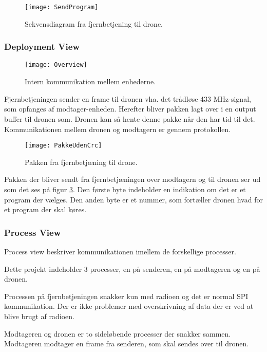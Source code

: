 \documentclass[Main]{subfiles}
\begin{document}
\begin{figure}[H]
\centering
\texttt{[image: SendProgram]}
\caption{Sekvensdiagram fra fjernbetjening til drone.}
\label{Fig:sendProgram}
\end{figure}

\subsubsection*{Deployment View}

\begin{figure}[H]
\centering
\texttt{[image: Overview]}
\caption{Intern kommunikation mellem enhederne.}
\label{Fig:Overview}
\end{figure}

Fjernbetjeningen sender en frame til dronen vha. det trådløse 433 MHz-signal, som opfanges af modtager-enheden.
Herefter bliver pakken lagt over i en output buffer til dronen som. Dronen kan så hente denne pakke når den har tid til det. Kommunikationen mellem dronen og modtagern er gennem \itoc protokollen.


\begin{figure}[H]
\centering
\texttt{[image: PakkeUdenCrc]}
\caption{Pakken fra fjernbetjæning til drone.}
\label{Fig:PakkeUdenCrc}
\end{figure}

Pakken der bliver sendt fra fjernbetjæningen over modtagern og til dronen ser ud som det ses på figur \ref{Fig:PakkeUdenCrc}.
Den første byte indeholder en indikation om det er et program der vælges.
Den anden byte er et nummer, som fortæller dronen hvad for et program der skal køres.






\subsubsection*{Process View}
Process view beskriver kommunikationen imellem de forskellige processer.

Dette projekt indeholder 3 processer, en på senderen, en på modtageren og en på dronen.

Processen på fjernbetjeningen snakker kun med radioen og det er normal SPI kommunikation. Der er ikke problemer med overskrivning af data der er ved at blive brugt af radioen.

Modtageren og dronen er to sideløbende processer der snakker sammen.
Modtageren modtager en frame fra senderen, som skal sendes over \itoc til dronen.
\end{document}
